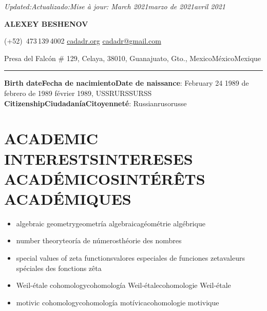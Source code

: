 \documentclass{article}
\newcommand{\biling}[3]{\ifdefined\english#1\fi\ifdefined\spanish#2\fi\ifdefined\french#3\fi}
\begin{document}
{\flushright\noindent\emph{\biling{Updated:}{Actualizado:}{Mise à jour:} \biling{March 2021}{marzo de 2021}{avril 2021}}

}

\begin{center}
{\LARGE\sffamily\bf ALEXEY BESHENOV}

\vspace{0.5em}

\faPhoneSquare{} (+52)~473\,139\,4002 \quad
\faGlobe{} \href{https://cadadr.org/}{cadadr.org} \quad
\faEnvelope{} \href{mailto:cadadr@gmail.com}{cadadr@gmail.com} \\

\vspace{0.5em}

Presa del Falcón \# 129, Celaya, 38010, Guanajuato, Gto., \biling{Mexico}{México}{Mexique}

\vspace{1em}

\rule{14cm}{1pt}

\end{center}

\vspace{1em}


\noindent \textbf{\biling{Birth date}{Fecha de nacimiento}{Date de naissance}}: \biling{February 24 1989}{24 de febrero de 1989}{24 février 1989}, \biling{USSR}{URSS}{URSS} \\
\textbf{\biling{Citizenship}{Ciudadanía}{Citoyenneté}}: \biling{Russian}{ruso}{russe}

{\color{RoyalBlue}\section*{\biling{ACADEMIC INTERESTS}{INTERESES ACADÉMICOS}{INTÉRÊTS ACADÉMIQUES}}}

\begin{itemize}
\item\biling{algebraic geometry}{geometría algebraica}{géométrie algébrique}
\item \biling{number theory}{teoría de números}{théorie des nombres}
\item \biling{special values of zeta functions}{valores especiales de funciones zeta}{valeurs spéciales des fonctions zêta}
\item \biling{Weil-étale cohomology}{cohomología Weil-étale}{cohomologie Weil-étale}
\item \biling{motivic cohomology}{cohomología motívica}{cohomologie motivique}
\end{itemize}
  
\end{document}
